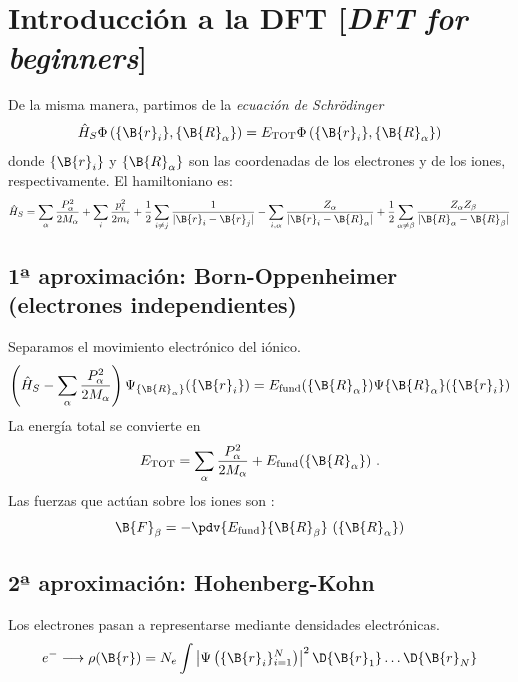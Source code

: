 \section[INTRO. DFT (FOR BEGINNERS)]{Introducción a la DFT [\emph{DFT for beginners}]}
De la misma manera, partimos de la \emph{ecuación de Schrödinger}
\begin{equation}
    \hat{H}_S \Phi\left ( \{ \B{r}_i \} , \{ \B{R}_\alpha  \} \right ) = E_\text{TOT} \Phi \left ( \{ \B{r}_i \} , \{ \B{R}_\alpha  \} \right )
\end{equation}
donde $\{ \B{r}_i\}$ y $\{ \B{R}_\alpha\}$ son las coordenadas de los electrones y de los iones, respectivamente. El hamiltoniano es:
\begin{equation}
    \hat{H}_S = \sum _\alpha \frac{P_\alpha ^2}{2M_\alpha } + \sum _i \frac{p_i^2}{2m_i} + \frac{1}{2} \sum_{i\neq j} \frac{1}{|\B{r}_i - \B{r}_j |} - \sum _{i,\alpha } \frac{Z_\alpha }{|\B{r}_i - \B{R}_\alpha |} + \frac{1}{2} \sum_{\alpha \neq \beta } \frac{Z_\alpha Z_\beta }{|\B{R}_\alpha - \B{R}_\beta |}
\end{equation}
\subsection{1ª aproximación: Born-Oppenheimer (electrones independientes)}
Separamos el movimiento electrónico del iónico.
\begin{equation}
    \left ( \hat{H}_S - \sum_\alpha \frac{P_\alpha ^2}{2M_\alpha } \right ) \Psi_{\{ \B{R}_\alpha  \} } (\{ \B{r}_i \}) = E_\text{fund}(\{ \B{R}_\alpha  \}) \Psi {\{ \B{R}_\alpha  \} } (\{ \B{r}_i \})
\end{equation}
La energía total se convierte en
\begin{equation}
    E_\text{TOT} = \sum_\alpha \frac{P_\alpha ^2}{2M_\alpha } + E_\text{fund} (\{ \B{R}_\alpha  \})\ .
\end{equation}
Las fuerzas que actúan sobre los iones son :
\begin{equation}
    \B{F}_\beta = -\pdv{E_\text{fund}}{\B{R}_\beta } \ (\{ \B{R}_\alpha  \})
\end{equation}
\subsection{2ª aproximación: Hohenberg-Kohn}
Los electrones pasan a representarse mediante densidades electrónicas.
$$
e^- \longrightarrow \rho(\B{r}) = N_e \int \left | \Psi \left (\{ \B{r}_i \}_{i=1}^N  \right ) \right |^2 \D{\B{r}_1}\ldots \D{\B{r}_N}
$$
